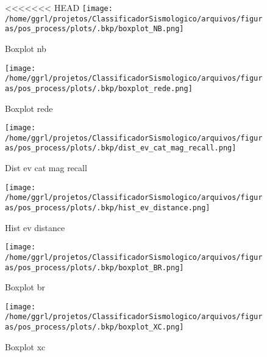                     \begin{figure}[H]
                        \centering
<<<<<<< HEAD
                        \texttt{[image: /home/ggrl/projetos/ClassificadorSismologico/arquivos/figuras/pos\_process/plots/.bkp/boxplot\_NB.png]}
                        \caption{Boxplot nb}
                        \label{fig:boxplot_NB}
                    \end{figure}
                

                    \begin{figure}[H]
                        \centering
                        \texttt{[image: /home/ggrl/projetos/ClassificadorSismologico/arquivos/figuras/pos\_process/plots/.bkp/boxplot\_rede.png]}
                        \caption{Boxplot rede}
                        \label{fig:boxplot_rede}
                    \end{figure}
                

                    \begin{figure}[H]
                        \centering
                        \texttt{[image: /home/ggrl/projetos/ClassificadorSismologico/arquivos/figuras/pos\_process/plots/.bkp/dist\_ev\_cat\_mag\_recall.png]}
                        \caption{Dist ev cat mag recall}
                        \label{fig:dist_ev_cat_mag_recall}
                    \end{figure}
                

                    \begin{figure}[H]
                        \centering
                        \texttt{[image: /home/ggrl/projetos/ClassificadorSismologico/arquivos/figuras/pos\_process/plots/.bkp/hist\_ev\_distance.png]}
                        \caption{Hist ev distance}
                        \label{fig:hist_ev_distance}
                    \end{figure}
                

                    \begin{figure}[H]
                        \centering
                        \texttt{[image: /home/ggrl/projetos/ClassificadorSismologico/arquivos/figuras/pos\_process/plots/.bkp/boxplot\_BR.png]}
                        \caption{Boxplot br}
                        \label{fig:boxplot_BR}
                    \end{figure}
                

                    \begin{figure}[H]
                        \centering
                        \texttt{[image: /home/ggrl/projetos/ClassificadorSismologico/arquivos/figuras/pos\_process/plots/.bkp/boxplot\_XC.png]}
                        \caption{Boxplot xc}
                        \label{fig:boxplot_XC}
                    \end{figure}
                

